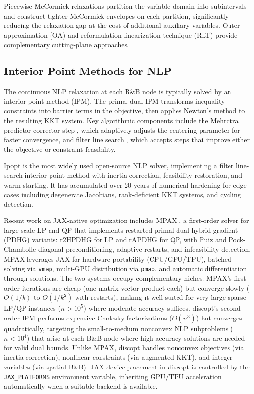 \documentclass[12pt,preprint]{article}
\begin{document}
Piecewise McCormick relaxations \cite{Castro2015} partition the variable domain into subintervals and construct tighter McCormick envelopes on each partition, significantly reducing the relaxation gap at the cost of additional auxiliary variables. Outer approximation (OA) \cite{Duran1986,Fletcher1994} and reformulation-linearization technique (RLT) \cite{Sherali1990} provide complementary cutting-plane approaches.

\subsection{Interior Point Methods for NLP}
\label{org-interior-point-methods-for-nlp}
The continuous NLP relaxation at each B\&B node is typically solved by an interior point method (IPM). The primal-dual IPM \cite{Wright1997,Nocedal2006} transforms inequality constraints into barrier terms in the objective, then applies Newton's method to the resulting KKT system. Key algorithmic components include the Mehrotra predictor-corrector step \cite{Mehrotra1992}, which adaptively adjusts the centering parameter for faster convergence, and filter line search \cite{Wachter2005,Wachter2006}, which accepts steps that improve either the objective or constraint feasibility.


Ipopt \cite{Wachter2006} is the most widely used open-source NLP solver, implementing a filter line-search interior point method with inertia correction, feasibility restoration, and warm-starting. It has accumulated over 20 years of numerical hardening for edge cases including degenerate Jacobians, rank-deficient KKT systems, and cycling detection.


Recent work on JAX-native optimization includes MPAX \cite{Lu2024}, a first-order solver for large-scale LP and QP that implements restarted primal-dual hybrid gradient (PDHG) variants: r2HPDHG for LP and rAPDHG for QP, with Ruiz and Pock-Chambolle diagonal preconditioning, adaptive restarts, and infeasibility detection. MPAX leverages JAX for hardware portability (CPU/GPU/TPU), batched solving via \texttt{vmap}, multi-GPU distribution via \texttt{pmap}, and automatic differentiation through solutions. The two systems occupy complementary niches: MPAX's first-order iterations are cheap (one matrix-vector product each) but converge slowly ($O(1/k)$ to $O(1/k^2)$ with restarts), making it well-suited for very large sparse LP/QP instances ($n > 10^5$) where moderate accuracy suffices. discopt's second-order IPM performs expensive Cholesky factorizations ($O(n^3)$) but converges quadratically, targeting the small-to-medium nonconvex NLP subproblems ($n < 10^4$) that arise at each B\&B node where high-accuracy solutions are needed for valid dual bounds. Unlike MPAX, discopt handles nonconvex objectives (via inertia correction), nonlinear constraints (via augmented KKT), and integer variables (via spatial B\&B). JAX device placement in discopt is controlled by the \texttt{JAX\_PLATFORMS} environment variable, inheriting GPU/TPU acceleration automatically when a suitable backend is available.
\end{document}
